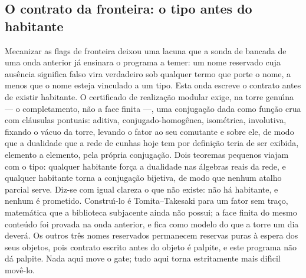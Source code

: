 \documentclass[11pt]{article}
\theoremstyle{definition}\newtheorem{deriv}{Derivação}
\begin{document}
\subsection*{O contrato da fronteira: o tipo antes do habitante}Mecanizar as flags de fronteira deixou uma lacuna que a sonda de bancada de uma onda anterior j\'a ensinara o programa a temer: um nome reservado cuja aus\^encia significa falso vira verdadeiro sob qualquer termo que porte o nome, a menos que o nome esteja vinculado a um tipo. Esta onda escreve o contrato antes de existir habitante. O certificado de realiza\c{c}\~ao modular exige, na torre genu\'\i{}na --- o completamento, n\~ao a face finita ---, uma conjuga\c{c}\~ao dada como fun\c{c}\~ao crua com cl\'ausulas pontuais: aditiva, conjugado-homog\^enea, isom\'etrica, involutiva, fixando o v\'acuo da torre, levando o fator ao seu comutante e sobre ele, de modo que a dualidade que a rede de cunhas hoje tem por defini\c{c}\~ao teria de ser exibida, elemento a elemento, pela pr\'opria conjuga\c{c}\~ao. Dois teoremas pequenos viajam com o tipo: qualquer habitante for\c{c}a a dualidade nas \'algebras reais da rede, e qualquer habitante torna a conjuga\c{c}\~ao bijetiva, de modo que nenhum atalho parcial serve. Diz-se com igual clareza o que n\~ao existe: n\~ao h\'a habitante, e nenhum \'e prometido. Constru\'\i{}-lo \'e Tomita--Takesaki para um fator sem tra\c{c}o, matem\'atica que a biblioteca subjacente ainda n\~ao possui; a face finita do mesmo conte\'udo foi provada na onda anterior, e fica como modelo do que a torre um dia dever\'a. Os outros tr\^es nomes reservados permanecem reservas puras \`a espera dos seus objetos, pois contrato escrito antes do objeto \'e palpite, e este programa n\~ao d\'a palpite. Nada aqui move o gate; tudo aqui torna estritamente mais dif\'\i{}cil mov\^e-lo.
\end{document}
